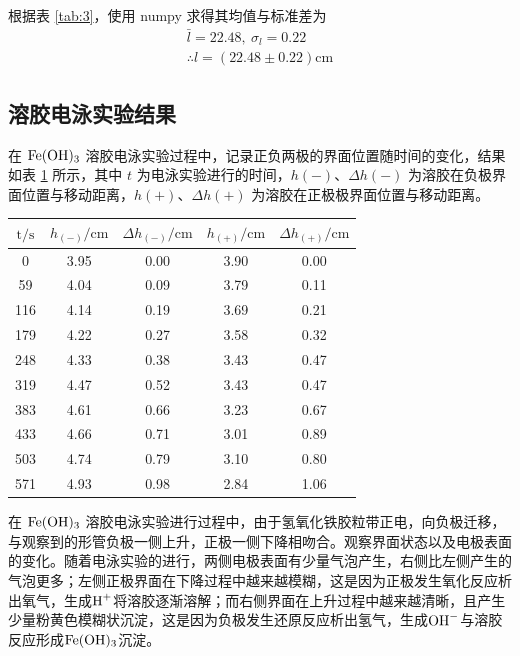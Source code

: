 根据表 \ref{tab:3}，使用 numpy 求得其均值与标准差为
\begin{gather*}
    \bar{l} = 22.48,\ \sigma_l = 0.22\\
    \therefore l=(22.48 \pm 0.22) \mathrm{cm}
\end{gather*}

\subsection{溶胶电泳实验结果}

在 \(\ce{Fe(OH)3}\) 溶胶电泳实验过程中，记录正负两极的界面位置随时间的变化，结果如表 \ref{tab:2} 所示，其中 $t$ 为电泳实验进行的时间，$h{(-)}$、$\Delta h{(-)}$ 为溶胶在负极界面位置与移动距离，$h{(+)}$、$\Delta h{(+)}$ 为溶胶在正极极界面位置与移动距离。

\begin{table}[htbp]
\centering
{}
\begin{tabular}{ccccc}
\toprule
$\mathrm{t} / \mathrm{s}$ & $h_{(-)} / \mathrm{cm}$ & $\Delta h_{(-)} / \mathrm{cm}$ & $h_{(+)} / \mathrm{cm}$ & $\Delta h_{(+)} / \mathrm{cm}$ \\
\midrule
0 & 3.95 & 0.00 & 3.90 & 0.00 \\
59 & 4.04 & 0.09 & 3.79 & 0.11 \\
116 & 4.14 & 0.19 & 3.69 & 0.21 \\
179 & 4.22 & 0.27 & 3.58 & 0.32 \\
248 & 4.33 & 0.38 & 3.43 & 0.47 \\
319 & 4.47 & 0.52 & 3.43 & 0.47 \\
383 & 4.61 & 0.66 & 3.23 & 0.67 \\
433 & 4.66 & 0.71 & 3.01 & 0.89 \\
503 & 4.74 & 0.79 & 3.10 & 0.80 \\
571 & 4.93 & 0.98 & 2.84 & 1.06 \\
\bottomrule
\end{tabular}
\label{tab:2}
\end{table}

在 \(\ce{Fe(OH)3}\) 溶胶电泳实验进行过程中，由于氢氧化铁胶粒带正电，向负极迁移，与观察到的形管负极一侧上升，正极一侧下降相吻合。观察界面状态以及电极表面的变化。随着电泳实验的进行，两侧电极表面有少量气泡产生，右侧比左侧产生的气泡更多；左侧正极界面在下降过程中越来越模糊，这是因为正极发生氧化反应析出氧气，生成$\ce{H+}$将溶胶逐渐溶解；而右侧界面在上升过程中越来越清晰，且产生少量粉黄色模糊状沉淀，这是因为负极发生还原反应析出氢气，生成$\ce{OH-}$与溶胶反应形成\(\ce{Fe(OH)3}\)沉淀。

